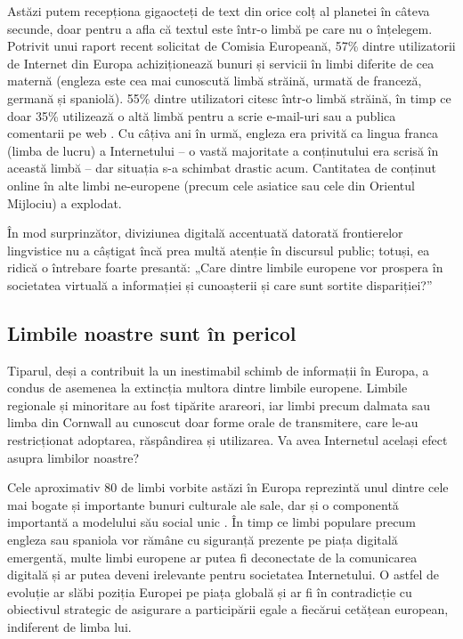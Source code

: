\begin{multicols}{2}
Astăzi putem recepționa gigaocteți de text din orice colț al planetei în câteva secunde, doar pentru a afla că textul este într-o limbă pe care nu o înțelegem. Potrivit unui raport recent solicitat de Comisia Europeană, 57\% dintre utilizatorii de Internet din Europa achiziționează bunuri și servicii în limbi diferite de cea maternă (engleza este cea mai cunoscută limbă străină, urmată de franceză, germană și spaniolă). 55\% dintre utilizatori citesc într-o limbă străină, în timp ce doar 35\% utilizează o altă limbă pentru a scrie e-mail-uri sau a publica comentarii pe web \cite{EC1}. Cu câțiva ani în urmă, engleza era privită ca lingua franca (limba de lucru) a Internetului -- o vastă majoritate a conținutului era scrisă în această limbă -- dar situația s-a schimbat drastic acum. Cantitatea de conținut online în alte limbi ne-europene (precum cele asiatice sau cele din Orientul Mijlociu) a explodat.

În mod surprinzător, diviziunea digitală accentuată datorată frontierelor lingvistice nu a câștigat încă prea multă atenție în discursul public; totuși, ea ridică o întrebare foarte presantă: „Care dintre limbile europene vor prospera în societatea virtuală a informației și cunoașterii și care sunt sortite dispariției?”

\subsection{Limbile noastre sunt în pericol}

Tiparul, deși a contribuit la un inestimabil schimb de informații în Europa, a condus de asemenea la extincția multora dintre limbile europene. Limbile regionale și minoritare au fost tipărite arareori, iar limbi precum dalmata sau limba din Cornwall au cunoscut doar forme orale de transmitere, care le-au restricționat adoptarea, răspândirea și utilizarea. Va avea Internetul același efect asupra limbilor noastre?

Cele aproximativ 80 de limbi vorbite astăzi în Europa reprezintă unul dintre cele mai bogate și importante bunuri culturale ale sale, dar și o componentă importantă a modelului său social unic \cite{EC2}. În timp ce limbi populare precum engleza sau spaniola vor rămâne cu siguranță prezente pe piața digitală emergentă, multe limbi europene ar putea fi deconectate de la comunicarea digitală și ar putea deveni irelevante pentru societatea Internetului. O astfel de evoluție ar slăbi poziția Europei pe piața globală și ar fi în contradicție cu obiectivul strategic de asigurare a participării egale a fiecărui cetățean european, indiferent de limba lui. 


\end{multicols}

